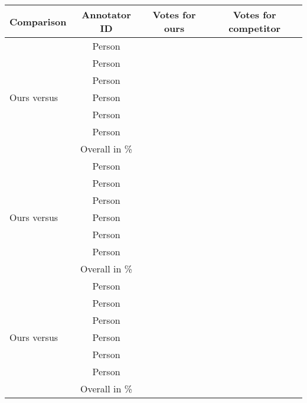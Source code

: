 \documentclass{article}
\begin{document}
\begin{table}
\begin{center}
\begin{tabular}{|l|c|c|c|}
\hline
Comparison                  &                Annotator ID & Votes for ours & Votes for competitor \\
\hline\hline
\multirow{7}{*}{Ours versus~\cite{wang2020arxiv}}  &  Person   &  &  \\
                                             &  Person   &  &  \\
                                             &  Person   &  &  \\         
                                             &  Person   &  &  \\  
                                             &  Person   &  &  \\ 
                                             &  Person   &  &   \\  
                                             \cline{2-4}
                                             & Overall in \%  &  &  \\
\hline                                             
\multirow{7}{*}{Ours versus~\cite{anwar2020arxiv}} &  Person   &  &  \\
                                             &  Person   &  &  \\
                                             &  Person   &  &  \\         
                                             &  Person   &  &  \\  
                                             &  Person   &  &  \\ 
                                             &  Person   &  &  \\  
                                             \cline{2-4}
                                             & Overall in \%  &  &  \\
\hline 
\multirow{7}{*}{Ours versus~\cite{huang2021icassp}} &  Person   &  &  \\
                                               &  Person   &  &  \\
                                               &  Person   &  &  \\         
                                               &  Person   &  &  \\  
                                               &  Person   &  &  \\ 
                                               &  Person   &  &  \\  
                                               \cline{2-4}
                                               & Overall in \%  &  &  \\
  

\end{tabular}
\end{center}
\end{table}
\end{document}
